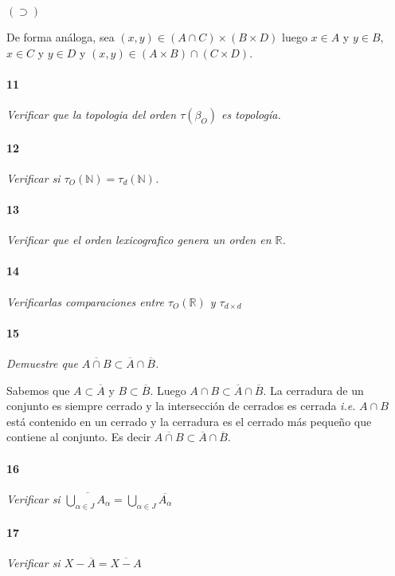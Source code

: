\documentclass[12pt]{article}
\begin{document}
$(\supset)$

De forma análoga, sea $(x,y) \in (A \cap C) \times (B \times D)$ luego  $x \in A $ y $y \in B$, $x \in C$ y $y \in D$ y $(x,y) \in (A \times B) \cap (C \times D)$.

\paragraph{11}
\textit{Verificar que la topologia del orden $\tau(\beta_O)$ es topología.}

\paragraph{12}
\textit{Verificar si $\tau_O (\mathbb{N})=\tau_d (\mathbb{N})$.}

\paragraph{13}
\textit{Verificar que el orden lexicografico genera un orden en $\mathbb{R}$.}

\paragraph{14}
\textit{Verificarlas comparaciones entre $\tau_O(\mathbb{R})$ y $\tau_{d\times d}$}

\paragraph{15}
\textit{Demuestre que $\overline{A \cap B} \subset \overline{A} \cap \overline{B}$.}

Sabemos que $A \subset \overline{A}$ y $B \subset \overline{B}$. Luego $A \cap B \subset \overline{A} \cap \overline{B}$. La cerradura de un conjunto es siempre
cerrado y la intersección de cerrados es cerrada \textit{i.e.} $A \cap B$ está contenido en un cerrado y la cerradura es el cerrado más pequeño que contiene al conjunto. Es decir
$\overline{A \cap B} \subset \overline{A} \cap \overline{B}$.

\paragraph{16}
\textit{Verificar si $\overline{\bigcup\limits_{\alpha\in J}A_{\alpha}}=\bigcup\limits_{\alpha\in J}\overline{A_{\alpha}}$}

\paragraph{17}
\textit{Verificar si $X-\overline{A}=\overline{X-A}$}
\end{document}

